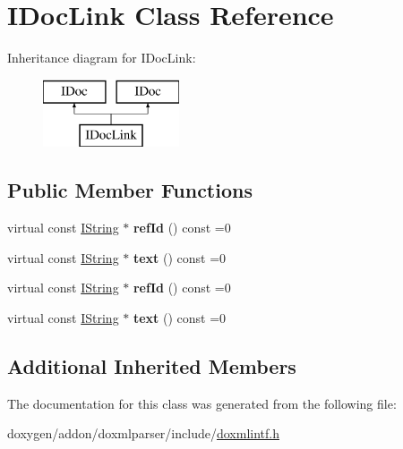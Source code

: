 \hypertarget{class_i_doc_link}{}\section{I\+Doc\+Link Class Reference}
\label{class_i_doc_link}
Inheritance diagram for I\+Doc\+Link\+:\begin{figure}[H]
\begin{center}
\leavevmode
\includegraphics[height=2.000000cm]{class_i_doc_link}
\end{center}
\end{figure}
\subsection*{Public Member Functions}
\begin{DoxyCompactItemize}
\item 
\mbox{\label{class_i_doc_link_af2784b7da0b47ee02a14d1b30e725a1b}} 
virtual const \mbox{\hyperlink{class_i_string}{I\+String}} $\ast$ {\bfseries ref\+Id} () const =0
\item 
\mbox{\label{class_i_doc_link_a544fd01d1759145cea8d45257dedd7e5}} 
virtual const \mbox{\hyperlink{class_i_string}{I\+String}} $\ast$ {\bfseries text} () const =0
\item 
\mbox{\label{class_i_doc_link_af2784b7da0b47ee02a14d1b30e725a1b}} 
virtual const \mbox{\hyperlink{class_i_string}{I\+String}} $\ast$ {\bfseries ref\+Id} () const =0
\item 
\mbox{\label{class_i_doc_link_a544fd01d1759145cea8d45257dedd7e5}} 
virtual const \mbox{\hyperlink{class_i_string}{I\+String}} $\ast$ {\bfseries text} () const =0
\end{DoxyCompactItemize}
\subsection*{Additional Inherited Members}


The documentation for this class was generated from the following file\+:\begin{DoxyCompactItemize}
\item 
doxygen/addon/doxmlparser/include/\mbox{\hyperlink{include_2doxmlintf_8h}{doxmlintf.\+h}}\end{DoxyCompactItemize}
